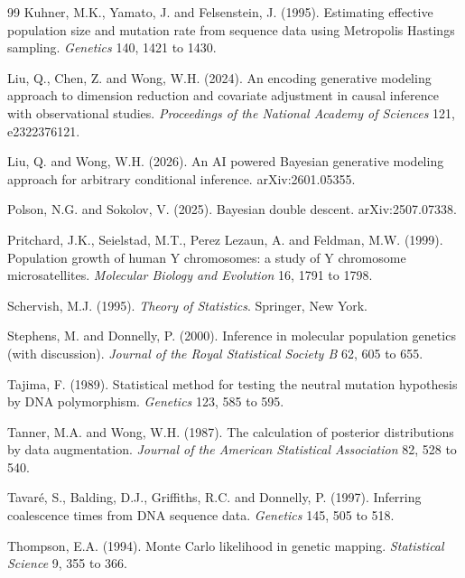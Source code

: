 \begin{thebibliography}{99}
Kuhner, M.K., Yamato, J. and Felsenstein, J. (1995). Estimating effective population size and
mutation rate from sequence data using Metropolis Hastings sampling. \emph{Genetics} 140,
1421 to 1430.

Liu, Q., Chen, Z. and Wong, W.H. (2024). An encoding generative modeling approach to dimension
reduction and covariate adjustment in causal inference with observational studies.
\emph{Proceedings of the National Academy of Sciences} 121, e2322376121.

Liu, Q. and Wong, W.H. (2026). An AI powered Bayesian generative modeling approach for arbitrary
conditional inference. arXiv:2601.05355.

Polson, N.G. and Sokolov, V. (2025). Bayesian double descent. arXiv:2507.07338.

Pritchard, J.K., Seielstad, M.T., Perez Lezaun, A. and Feldman, M.W. (1999). Population growth
of human Y chromosomes: a study of Y chromosome microsatellites. \emph{Molecular Biology and
Evolution} 16, 1791 to 1798.

Schervish, M.J. (1995). \emph{Theory of Statistics}. Springer, New York.

Stephens, M. and Donnelly, P. (2000). Inference in molecular population genetics (with
discussion). \emph{Journal of the Royal Statistical Society B} 62, 605 to 655.

Tajima, F. (1989). Statistical method for testing the neutral mutation hypothesis by DNA
polymorphism. \emph{Genetics} 123, 585 to 595.

Tanner, M.A. and Wong, W.H. (1987). The calculation of posterior distributions by data
augmentation. \emph{Journal of the American Statistical Association} 82,
528 to 540.

Tavar\'e, S., Balding, D.J., Griffiths, R.C. and Donnelly, P. (1997). Inferring coalescence
times from DNA sequence data. \emph{Genetics} 145, 505 to 518.

Thompson, E.A. (1994). Monte Carlo likelihood in genetic mapping. \emph{Statistical Science}
9, 355 to 366.


\end{thebibliography}
